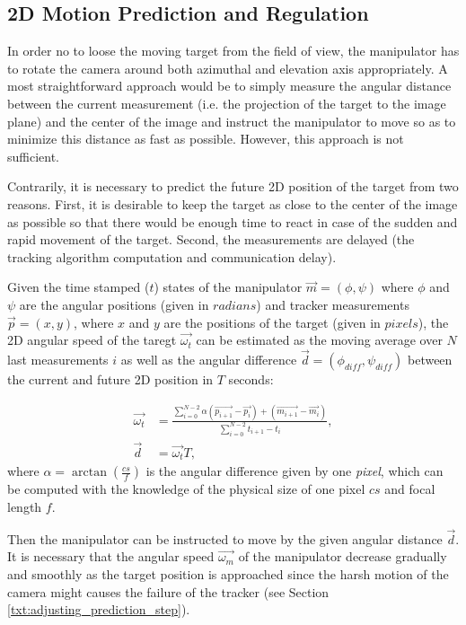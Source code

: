 \subsection{2D Motion Prediction and Regulation} \label{txt:2d_motion_prediction_and_regulation}

In order no to loose the moving target from the field of view, the manipulator has to rotate the camera around both azimuthal and elevation axis appropriately. A most straightforward approach would be to simply measure the angular distance between the current measurement (i.e. the projection of the target to the image plane) and the center of the image and instruct the manipulator to move so as to minimize this distance as fast as possible. However, this approach is not sufficient. 

Contrarily, it is necessary to predict the future 2D position of the target from two reasons. First, it is desirable to keep the target as close to the center of the image as possible so that there would be enough time to react in case of the sudden and rapid movement of the target. Second, the measurements are delayed (the tracking algorithm computation and communication delay).

Given the time stamped ($t$) states of the manipulator $\vec{m} = (\phi, \psi)$ where $\phi$ and $\psi$ are the angular positions (given in $radians$) and tracker measurements $\vec{p} = (x, y)$, where $x$ and $y$ are the positions of the target (given in $pixels$), the 2D angular speed of the taregt $\vec{\omega_{t}}$ can be estimated as the moving average over $N$ last measurements $i$ as well as the angular difference $\vec{d} = (\phi_{diff}, \psi_{diff})$ between the current and future 2D position in $T$ seconds:

\begin{align}
	\vec{\omega_{t}} &= \frac{\sum_{i=0}^{N-2}{\alpha(\vec{p_{i+1}} - \vec{p_{i}}) + (\vec{m_{i+1}} - \vec{m_{i}})}}{\sum_{i=0}^{N-2}{t_{i+1} - t_{i}}},\\
	\vec{d} &= \vec{\omega_{t}}T,
\end{align}
where $\alpha = \arctan{(\frac{cs}{f})}$ is the angular difference given by one \textit{pixel}, which can be computed with the knowledge of the physical size of one pixel $cs$ and focal length $f$.

Then the manipulator can be instructed to move by the given angular distance $\vec{d}$. It is necessary that the angular speed $\vec{\omega_{m}}$ of the manipulator decrease gradually and smoothly as the target position is approached since the harsh motion of the camera might causes the failure of the tracker (see Section \ref{txt:adjusting_prediction_step}).


